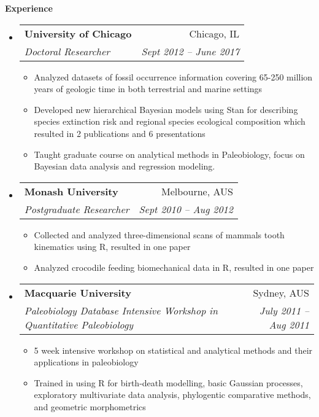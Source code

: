 \documentclass[letterpaper,11pt]{article}
\makeatletter
\newcommand{\resitem}[1]{\item #1 \vspace{-2pt}}
\newcommand{\resheading}[1]{{\large \colorbox{mygrey}{\begin{minipage}{\textwidth}{\textbf{#1 \vphantom{p\^{E}}}}\end{minipage}}}}
\newcommand{\ressubheading}[4]{
\begin{tabular*}{6.5in}{l@{\extracolsep{\fill}}r}
		\textbf{#1} & #2 \\
		\textit{#3} & \textit{#4} \\
\end{tabular*}\vspace{-6pt}}
\makeatother
\begin{document}
\resheading{Experience}
	\begin{itemize}
		\item 
			\ressubheading{University of Chicago}{Chicago, IL}{Doctoral Researcher}{Sept 2012 -- June 2017}
				{ \footnotesize
				\begin{itemize}
            \resitem{Analyzed datasets of fossil occurrence information covering 65-250 million years of geologic time in both terrestrial and marine settings }
            \resitem{Developed new hierarchical Bayesian models using Stan for describing species extinction risk and regional species ecological composition which resulted in 2 publications and 6 presentations }
            \resitem{Taught graduate course on analytical methods in Paleobiology, focus on Bayesian data analysis and regression modeling.}
				\end{itemize}
				}
		\item 
			\ressubheading{Monash University}{Melbourne, AUS}{Postgraduate Researcher}{Sept 2010 -- Aug 2012}
				{ \footnotesize
				\begin{itemize}
            \resitem{Collected and analyzed three-dimensional scans of mammals tooth kinematics using R, resulted in one paper }
            \resitem{Analyzed crocodile feeding biomechanical data in R, resulted in one paper }
				\end{itemize}
				}
		\item 
			\ressubheading{Macquarie University}{Sydney, AUS}{Paleobiology Database Intensive Workshop in Quantitative Paleobiology}{July 2011 -- Aug 2011}
				{ \footnotesize
				\begin{itemize}
            \resitem{5 week intensive workshop on statistical and analytical methods and their applications in paleobiology}
            \resitem{Trained in using R for birth-death modelling, basic Gaussian processes, exploratory multivariate data analysis, phylogentic comparative methods, and geometric morphometrics}
				\end{itemize}
				}

\end{itemize}
\end{document}
